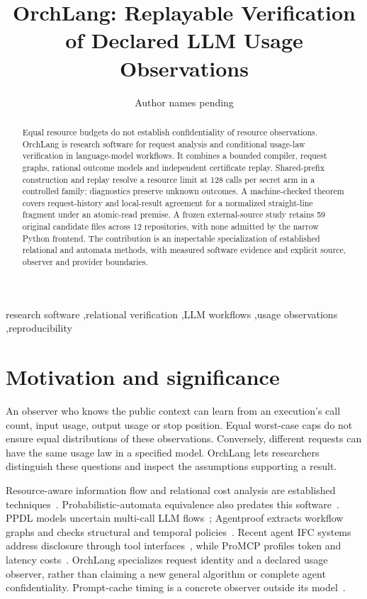 \documentclass[preprint,12pt,a4paper]{elsarticle}
\begin{document}
\begin{frontmatter}
\title{OrchLang: Replayable Verification of Declared LLM Usage Observations}
\author{Author names pending}
\address{Affiliations and postal addresses pending}
\begin{abstract}
Equal resource budgets do not establish confidentiality of resource observations. OrchLang is research software for request analysis and conditional usage-law verification in language-model workflows. It combines a bounded compiler, request graphs, rational outcome models and independent certificate replay. Shared-prefix construction and replay resolve a resource limit at 128 calls per secret arm in a controlled family; diagnostics preserve unknown outcomes. A machine-checked theorem covers request-history and local-result agreement for a normalized straight-line fragment under an atomic-read premise. A frozen external-source study retains 59 original candidate files across 12 repositories, with none admitted by the narrow Python frontend. The contribution is an inspectable specialization of established relational and automata methods, with measured software evidence and explicit source, observer and provider boundaries.
\end{abstract}
\begin{keyword}
research software \sep relational verification \sep LLM workflows \sep usage observations \sep reproducibility
\end{keyword}
\end{frontmatter}

\section{Motivation and significance}
An observer who knows the public context can learn from an execution's call count, input usage, output usage or stop position. Equal worst-case caps do not ensure equal distributions of these observations. Conversely, different requests can have the same usage law in a specified model. OrchLang lets researchers distinguish these questions and inspect the assumptions supporting a result.

Resource-aware information flow and relational cost analysis are established techniques~\cite{constant,relcost}. Probabilistic-automata equivalence also predates this software~\cite{kiefer}. PPDL models uncertain multi-call LLM flows~\cite{ppdl}; Agentproof extracts workflow graphs and checks structural and temporal policies~\cite{agentproof}. Recent agent IFC systems address disclosure through tool interfaces~\cite{appa,flowseal}, while ProMCP profiles token and latency costs~\cite{promcp}. OrchLang specializes request identity and a declared usage observer, rather than claiming a new general algorithm or complete agent confidentiality. Prompt-cache timing is a concrete observer outside its model~\cite{cache}.
\end{document}

